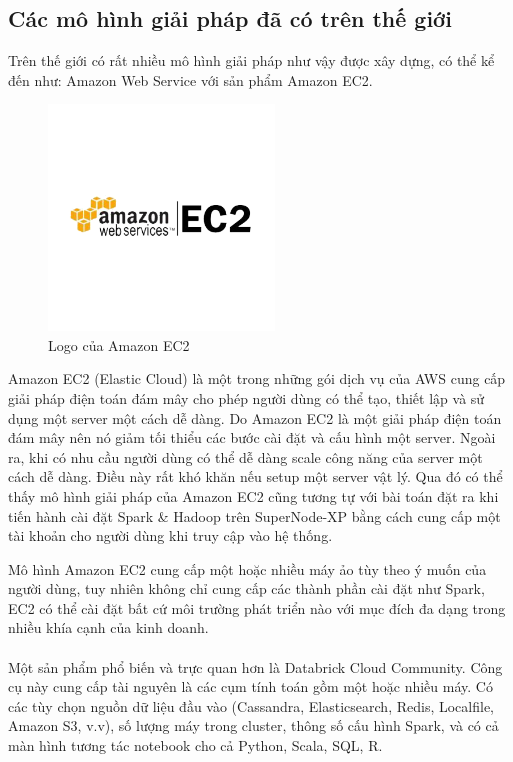 \documentclass[11pt,a4paper]{article}
\begin{document}
\subsection{Các mô hình giải pháp đã có trên thế giới}
Trên thế giới có rất nhiều mô hình giải pháp như vậy được xây dựng, có thể kể đến như: Amazon Web Service với sản phẩm Amazon EC2. \\
\begin{figure}[h]
    \centering
    \includegraphics[width=6cm]{fig/aws_ec2.png}
    \caption{Logo của Amazon EC2}
    \label{fig:amazon_ec2}
\end{figure}

Amazon EC2 (Elastic Cloud) là một trong những gói dịch vụ của AWS cung cấp giải pháp điện toán đám mây cho phép người dùng có thể tạo, thiết lập và sử dụng một server một cách dễ dàng. Do Amazon EC2 là một giải pháp điện toán đám mây nên nó giảm tối thiểu các bước cài đặt và cấu hình một server. Ngoài ra, khi có nhu cầu người dùng có thể dễ dàng scale công năng của server một cách dễ dàng. Điều này rất khó khăn nếu setup một server vật lý. Qua đó có thể thấy mô hình giải pháp của Amazon EC2 cũng tương tự với bài toán đặt ra khi tiến hành cài đặt Spark \& Hadoop trên SuperNode-XP bằng cách cung cấp một tài khoản cho người dùng khi truy cập vào hệ thống.\cite{EC2}

Mô hình Amazon EC2 cung cấp một hoặc nhiều máy ảo tùy theo ý muốn của người dùng, tuy nhiên không chỉ cung cấp các thành phần cài đặt như Spark, EC2 có thể cài đặt bất cứ môi trường phát triển nào với mục đích đa dạng trong nhiều khía cạnh của kinh doanh.\\
\\
Một sản phẩm phổ biến và trực quan hơn là Databrick Cloud Community\cite{databrick}. Công cụ này cung cấp tài nguyên là các cụm tính toán gồm một hoặc nhiều máy. Có các tùy chọn nguồn dữ liệu đầu vào (Cassandra, Elasticsearch, Redis, Localfile, Amazon S3, v.v), số lượng máy trong cluster, thông số cấu hình Spark, và có cả màn hình tương tác notebook cho cả Python, Scala, SQL, R. 
\end{document}

